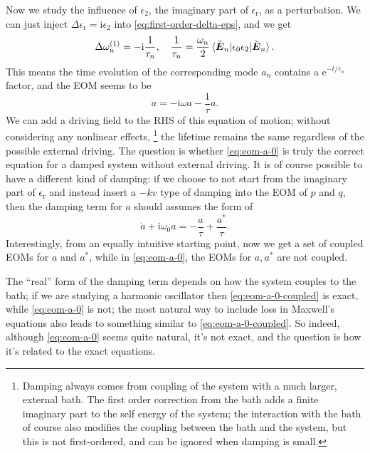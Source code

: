 \documentclass[hyperref, a4paper]{article}
\newcommand*{\ii}{\mathrm{i}}
\newcommand*{\ee}{\mathrm{e}}
\newcommand{\epsr}{\epsilon_{\text{r}}}
\begin{document}
Now we study the influence of $\epsilon_2$, the imaginary part of $\epsr$, as a perturbation.
We can just inject $\Delta \epsr = \ii \epsilon_2$ into \eqref{eq:first-order-delta-eps}, 
and we get 
\begin{equation}
    \Delta \omega_n^{(1)} = - \ii \frac{1}{\tau_n}, \quad 
    \frac{1}{\tau_n} = \frac{\omega_n}{2} \mel*{\tilde{\vb*{E}}_n}{\epsilon_0 \epsilon_2}{\tilde{\vb*{E}}_n}.
\end{equation}
This means the time evolution of the corresponding mode $a_n$ contains a $\ee^{- t / \tau_n}$ factor, 
and the EOM seems to be 
\begin{equation}
    \dot{a} = - \ii \omega a - \frac{1}{\tau} a.
    \label{eq:eom-a-0}
\end{equation}
We can add a driving field to the RHS of this equation of motion; 
without considering any nonlinear effects,%
\footnote{
    Damping always comes from coupling of the system with a much larger, external bath.
    The first order correction from the bath 
    adds a finite imaginary part to the self energy of the system; 
    the interaction with the bath of course also modifies the 
    coupling between the bath and the system, 
    but this is not first-ordered, 
    and can be ignored when damping is small.
}
the lifetime remains the same regardless of the possible external driving.
The question is whether \eqref{eq:eom-a-0} is truly the correct equation 
for a damped system without external driving.
It is of course possible to have a different kind of damping:
if we choose to not start from the imaginary part of $\epsr$ 
and instead insert a $- k v$ type of damping into the EOM of $p$ and $q$, 
then the damping term for $a$ should assumes the form of 
\begin{equation}
    \dot{a} + \ii \omega_0 a = - \frac{a}{\tau} + \frac{a^*}{\tau}.
    \label{eq:eom-a-0-coupled}
\end{equation}
Interestingly, from an equally intuitive starting point, 
now we get a set of coupled EOMs for $a$ and $a^*$, 
while in \eqref{eq:eom-a-0}, the EOMs for $a, a^*$ are not coupled.

The ``real'' form of the damping term depends on how the system couples to the bath; 
if we are studying a harmonic oscillator then \eqref{eq:eom-a-0-coupled} is exact, 
while \eqref{eq:eom-a-0} is not; 
the most natural way to include loss in Maxwell's equations also leads to 
something similar to \eqref{eq:eom-a-0-coupled}.
So indeed, although \eqref{eq:eom-a-0} seems quite natural, 
it's not exact, and the question is how it's related to the exact equations.
\end{document}
